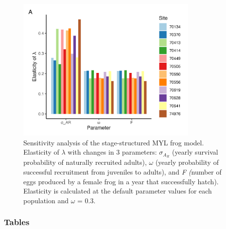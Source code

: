 \documentclass[9pt,twoside,lineno]{pnas-new}
\begin{document}
\begin{figure}

{\centering \includegraphics[width=0.8\textwidth]{figures/pop_viability_figures_for_supp.jpg}

}

\caption{\label{fig-viability-supp}Sensitivity analysis of the
stage-structured MYL frog model. Elasticity of \(\lambda\) with changes
in 3 parameters: \(\sigma_{A_R}\) (yearly survival probability of
naturally recruited adults), \(\omega\) (yearly probability of
successful recruitment from juveniles to adults), and \emph{F (}number
of eggs produced by a female frog in a year that successfully hatch).
Elasticity is calculated at the default parameter values for each
population and \(\omega\) = 0.3.}

\end{figure}\clearpage

\newpage

\hypertarget{tables}{%
\subsubsection{Tables}\label{tables}}

\hfill\break
\end{document}
